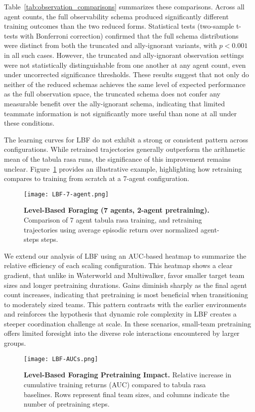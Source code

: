 Table~\ref{tab:observation_comparisons} summarizes these comparisons. Across all agent counts, 
the full observability schema produced significantly different training outcomes 
than the two reduced forms. Statistical tests (two-sample t-tests with Bonferroni correction) 
confirmed that the full schema distributions were distinct from both the 
truncated and ally-ignorant variants, with $p < 0.001$ in all such cases. 
However, the truncated and ally-ignorant observation settings were not 
statistically distinguishable from one another at any agent count, 
even under uncorrected significance thresholds. 
These results suggest that not only do neither of the reduced schemas 
achieves the same level of expected performance as the full observation space, 
the truncated schema does not confer any measurable benefit over 
the ally-ignorant schema, indicating that limited teammate information is not 
significantly more useful than none at all under these conditions.

The learning curves for LBF do not exhibit a strong or consistent pattern across configurations. 
While retrained trajectories generally outperform the arithmetic mean of the tabula rasa runs, 
the significance of this improvement remains unclear. 
Figure~\ref{fig:lbf-7} provides an illustrative example, highlighting how retraining compares 
to training from scratch at a 7-agent configuration.

\begin{figure}[!ht]
    \centering
    \texttt{[image: LBF-7-agent.png]}
    \caption{\textbf{Level-Based Foraging (7 agents, 2-agent pretraining).} Comparison of 
    7 agent tabula rasa training, and retraining trajectories using average 
    episodic return over normalized agent-steps steps.}
    \label{fig:lbf-7}
\end{figure}

We extend our analysis of LBF using an AUC-based heatmap to summarize the 
relative efficiency of each scaling configuration. 
This heatmap shows a clear gradient, that unlike in Waterworld and Multiwalker, 
favor smaller target team sizes and longer pretraining durations. 
Gains diminish sharply as the final agent count increases, 
indicating that pretraining is most beneficial when transitioning to moderately sized teams. 
This pattern contrasts with the earlier environments and reinforces the hypothesis that 
dynamic role complexity in LBF creates a steeper coordination challenge at scale. 
In these scenarios, small-team pretraining offers limited foresight into the diverse role 
interactions encountered by larger groups.

\begin{figure}[ht]
    \centering
    \texttt{[image: LBF-AUCs.png]}
    \caption{\textbf{Level-Based Foraging Pretraining Impact.} 
    Relative increase in cumulative training returns (AUC) compared to tabula rasa baselines. 
    Rows represent final team sizes, and columns indicate the number of pretraining steps.}
    \label{fig:lbf-aucs}
\end{figure}

\FloatBarrier

